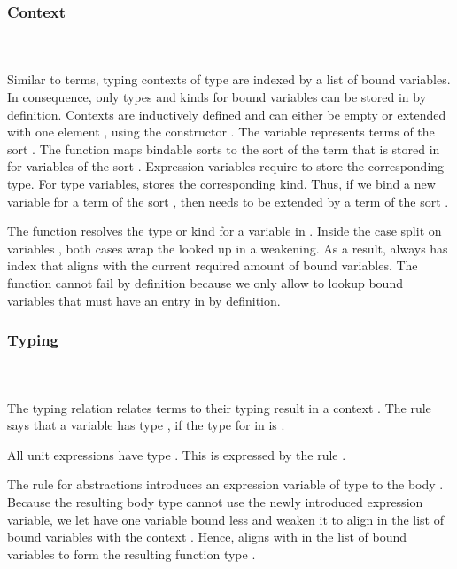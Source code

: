 \subsubsection{Context}\hfill\\\\
Similar to terms, typing contexts  of type   are indexed by a list of bound variables.
In consequence, only types and kinds for bound variables can be stored in  by definition.
\FCtx
Contexts are inductively defined and can either be empty  or extended with one element , using the constructor   .
The variable  represents terms of the sort  . 
\noindent The function  maps bindable sorts  to the sort of the term that is stored in  for variables of the sort .
\Fkind
Expression variables require  to store the corresponding type. 
For type variables,  stores the corresponding kind. 
Thus, if we bind a new variable for a term of the sort , then  needs to be extended by a term of the sort  .

\noindent The  function resolves the type or kind  for a variable  in .
\Flookup
Inside the case split on variables , both cases wrap the looked up  in a weakening. 
As a result,  always has index  that aligns with the current required amount of bound variables. 
The  function cannot fail by definition because we only allow to lookup bound variables that must have an entry in  by definition.

\subsubsection{Typing}\hfill\\\\
The typing relation    \Data{:}  relates terms  to their typing result  in a context .
\FTyping
The rule  says that a variable   has type , if the type for  in  is . 

\noindent All unit expressions  have type . This is expressed by the rule .

\noindent The rule for abstractions  introduces an expression variable of type  to the body . 
Because the resulting body type  cannot use the newly introduced expression variable, we let  have one variable bound less and weaken it to align in the list of bound variables with the context   . 
Hence,  aligns with  in the list of bound variables to form the resulting function type   . 


